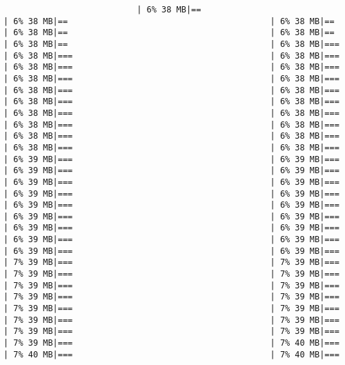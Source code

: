 \documentclass[
]{article}
\begin{document}
\begin{verbatim}
                           | 6% 38 MB|==                                         | 6% 38 MB|==                                         | 6% 38 MB|==                                         | 6% 38 MB|==                                         | 6% 38 MB|==                                         | 6% 38 MB|==                                         | 6% 38 MB|===                                        | 6% 38 MB|===                                        | 6% 38 MB|===                                        | 6% 38 MB|===                                        | 6% 38 MB|===                                        | 6% 38 MB|===                                        | 6% 38 MB|===                                        | 6% 38 MB|===                                        | 6% 38 MB|===                                        | 6% 38 MB|===                                        | 6% 38 MB|===                                        | 6% 38 MB|===                                        | 6% 38 MB|===                                        | 6% 38 MB|===                                        | 6% 38 MB|===                                        | 6% 38 MB|===                                        | 6% 38 MB|===                                        | 6% 38 MB|===                                        | 6% 38 MB|===                                        | 6% 39 MB|===                                        | 6% 39 MB|===                                        | 6% 39 MB|===                                        | 6% 39 MB|===                                        | 6% 39 MB|===                                        | 6% 39 MB|===                                        | 6% 39 MB|===                                        | 6% 39 MB|===                                        | 6% 39 MB|===                                        | 6% 39 MB|===                                        | 6% 39 MB|===                                        | 6% 39 MB|===                                        | 6% 39 MB|===                                        | 6% 39 MB|===                                        | 6% 39 MB|===                                        | 6% 39 MB|===                                        | 6% 39 MB|===                                        | 6% 39 MB|===                                        | 7% 39 MB|===                                        | 7% 39 MB|===                                        | 7% 39 MB|===                                        | 7% 39 MB|===                                        | 7% 39 MB|===                                        | 7% 39 MB|===                                        | 7% 39 MB|===                                        | 7% 39 MB|===                                        | 7% 39 MB|===                                        | 7% 39 MB|===                                        | 7% 39 MB|===                                        | 7% 39 MB|===                                        | 7% 39 MB|===                                        | 7% 39 MB|===                                        | 7% 39 MB|===                                        | 7% 40 MB|===                                        | 7% 40 MB|===                                        | 7% 40 MB|===                                      
\end{verbatim}
\end{document}
